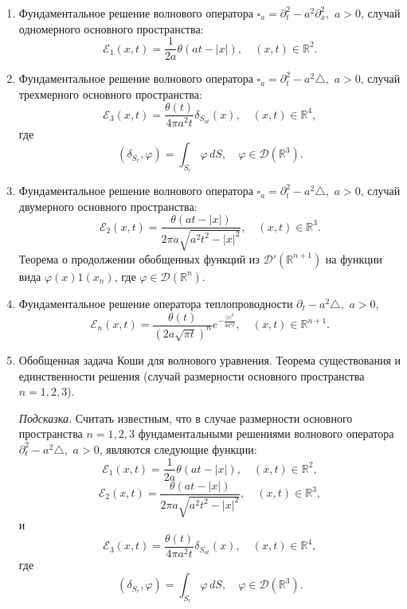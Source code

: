\documentclass[12pt,a4paper,draft]{article}
\DeclareRobustCommand*{\т}{~--- }
\DeclareRobustCommand*{\ч}{~-- }
\begin{document}
\begin{enumerate}
\item
Фундаментальное решение волнового оператора $
    \square_a = \partial_t^2 - a^2 \partial_x^2,
$ $a > 0$, случай одномерного основного пространства:
$$
    {\mathcal E}_1 (x, t)
    =
    \frac{1}{2 a}
    \theta (a t - |x|),
    \quad
    (x, t)
    \in
    {\mathbb R}^2.
$$

\item
Фундаментальное решение волнового оператора $
    \square_a = \partial_t^2 - a^2 \triangle,
$ $a > 0$, случай трехмерного основного пространства:
$$
    {\mathcal E}_3 (x, t)
    =
    \frac{
        \theta (t)
    }{
        4
        \pi
        a^2
        t
    }
    \delta_{
        S_{at}
    }
     (x),
    \quad
    (x, t)
    \in
    {\mathbb R}^4,
$$
где
$$
    (\delta_{S_r}, \varphi)
    =
    \int_{
        S_r
    }
    \varphi
    \,
    dS,
    \quad
    \varphi \in {\mathcal D} ({\mathbb R}^3).
$$

\item
Фундаментальное решение волнового оператора $
    \square_a = \partial_t^2 - a^2 \triangle,
$ $a > 0$, случай двумерного основного пространства:
$$
    {\mathcal E}_2 (x, t)
    =
    \frac{
        \theta (at - |x|)
    }{
        2
        \pi
        a
        \sqrt{
            a^2 t^2 - |x|^2
        }
    },
    \quad
    (x, t)
    \in
    {\mathbb R}^3.
$$
Теорема о продолжении обобщенных функций из ${\mathcal D}'
({\mathbb R}^{n+1})$ на функции вида $\varphi (x) 1 (x_n)$, где
$\varphi \in {\mathcal D} ({\mathbb R}^n)$.

\item
Фундаментальное решение оператора теплопроводности $
    \partial_t - a^2 \triangle,
$ $a > 0$,
$$
    {\mathcal E}_n (x, t)
    =
    \frac{
        \theta (t)
    }{
        (
            2
            a
            \sqrt{
                \pi t
            }
        )^n
    }
    e^{
        - \frac{
            |x|^2
        }{
            4 a^2 t
        }
    },
    \quad
    (x, t) \in {\mathbb R}^{n+1}.
$$

\item
Обобщенная задача Коши для волнового уравнения. Теорема
существования и единственности решения (случай размерности
основного пространства $n = 1,2,3$).

{\it Подсказка.} Считать известным, что в случае размерности
основного пространства $n = 1,2,3$ фундаментальными решениями
волнового оператора $
    \partial_t^2 - a^2 \triangle,
$ $a > 0$, являются следующие функции:
$$
    {\mathcal E}_1 (x, t)
    =
    \frac{1}{2 a}
    \theta (a t - |x|),
    \quad
    (x, t)
    \in
    {\mathbb R}^2,
$$
$$
    {\mathcal E}_2 (x, t)
    =
    \frac{
        \theta (at - |x|)
    }{
        2
        \pi
        a
        \sqrt{
            a^2 t^2 - |x|^2
        }
    },
    \quad
    (x, t)
    \in
    {\mathbb R}^3,
$$
и
$$
    {\mathcal E}_3 (x, t)
    =
    \frac{
        \theta (t)
    }{
        4
        \pi
        a^2
        t
    }
    \delta_{
        S_{at}
    }
     (x),
    \quad
    (x, t)
    \in
    {\mathbb R}^4,
$$
где
$$
    (\delta_{S_r}, \varphi)
    =
    \int_{
        S_r
    }
    \varphi
    \,
    dS,
    \quad
    \varphi \in {\mathcal D} ({\mathbb R}^3).
$$


\end{enumerate}
\end{document}
